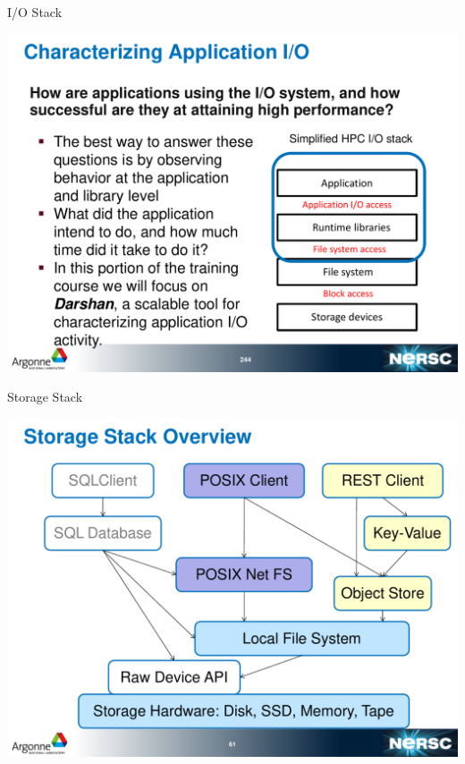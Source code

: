 \documentclass[compress,11pt,xcolor=svgnames,aspectratio=169]{beamer}
\begin{document}
\begin{frame}[t]{I/O Stack}

\begin{center}
\includegraphics[scale=0.3]{fig/io-stack3}
\end{center}

\end{frame}

\begin{frame}[t]{Storage Stack}

\begin{center}
\includegraphics[scale=0.3]{fig/storage-stack}
\end{center}

\end{frame}
\end{document}

